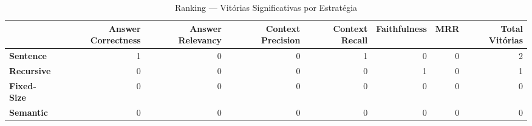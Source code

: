 \begin{table}
\caption{Ranking — Vitórias Significativas por Estratégia}
\label{tab:ranking}
\begin{tabular}{lrrrrrrr}
\toprule
 & Answer Correctness & Answer Relevancy & Context Precision & Context Recall & Faithfulness & MRR & Total Vitórias \\
\midrule
\textbf{Sentence} & 1 & 0 & 0 & 1 & 0 & 0 & 2 \\
\textbf{Recursive} & 0 & 0 & 0 & 0 & 1 & 0 & 1 \\
\textbf{Fixed-Size} & 0 & 0 & 0 & 0 & 0 & 0 & 0 \\
\textbf{Semantic} & 0 & 0 & 0 & 0 & 0 & 0 & 0 \\
\bottomrule
\end{tabular}
\end{table}
